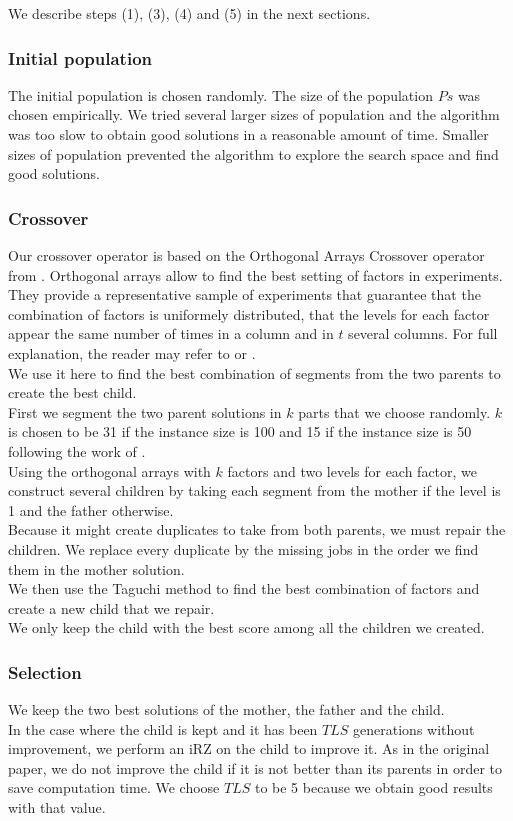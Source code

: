 \documentclass[a4paper,10pt]{article}
\begin{document}
		We describe steps (1), (3), (4) and (5) in the next sections.

		\subsubsection{Initial population}
			The initial population is chosen randomly. The size of the population $Ps$ was chosen empirically. We tried several larger sizes of population and the algorithm was too slow to obtain good solutions in a reasonable amount of time. Smaller sizes of population prevented the algorithm to explore the search space and find good solutions.

		\subsubsection{Crossover}
			Our crossover operator is based on the Orthogonal Arrays Crossover operator from \cite{tseng2010genetic}. Orthogonal arrays allow to find the best setting of factors in experiments. They provide a representative sample of experiments that guarantee that the combination of factors is uniformely distributed, that the levels for each factor appear the same number of times in a column and in $t$ several columns. For full explanation, the reader may refer to \cite{tseng2010genetic} or \cite{montgomery1991design}. \\
			We use it here to find the best combination of segments from the two parents to create the best child. \\
			First we segment the two parent solutions in $k$ parts that we choose randomly. $k$ is chosen to be 31 if the instance size is 100 and 15 if the instance size is 50 following the work of \cite{tseng2010genetic}. \\
			Using the orthogonal arrays with $k$ factors and two levels for each factor, we construct several children by taking each segment from the mother if the level is 1 and the father otherwise. \\
			Because it might create duplicates to take from both parents, we must repair the children. We replace every duplicate by the missing jobs in the order we find them in the mother solution. \\
			We then use the Taguchi method to find the best combination of factors and create a new child that we repair. \\
			We only keep the child with the best score among all the children we created.

		\subsubsection{Selection}
			We keep the two best solutions of the mother, the father and the child. \\
			In the case where the child is kept and it has been $TLS$ generations without improvement, we perform an iRZ on the child to improve it. As in the original paper, we do not improve the child if it is not better than its parents in order to save computation time. We choose $TLS$ to be 5 because we obtain good results with that value.
\end{document}
